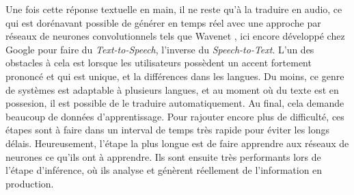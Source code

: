 Une fois cette réponse textuelle en main, il ne reste qu'à la traduire en audio, ce qui est dorénavant possible de générer en temps réel avec une approche par réseaux de neurones convolutionnels tels que Wavenet \cite{wavenet}, ici encore développé chez Google pour faire du \textit{Text-to-Speech}, l'inverse du \textit{Speech-to-Text}. L'un des obstacles à cela est lorsque les utilisateurs possèdent un accent fortement prononcé et qui est unique, et la différences dans les langues. Du moins, ce genre de systèmes est adaptable à plusieurs langues, et au moment où du texte est en possesion, il est possible de le traduire automatiquement. Au final, cela demande beaucoup de données d'apprentissage. Pour rajouter encore plus de difficulté, ces étapes sont à faire dans un interval de temps très rapide pour éviter les longs délais. Heureusement, l'étape la plus longue est de faire apprendre aux réseaux de neurones ce qu'ils ont à apprendre. Ils sont ensuite très performants lors de l'étape d'inférence, où ils analyse et génèrent réellement de l'information en production. \\
